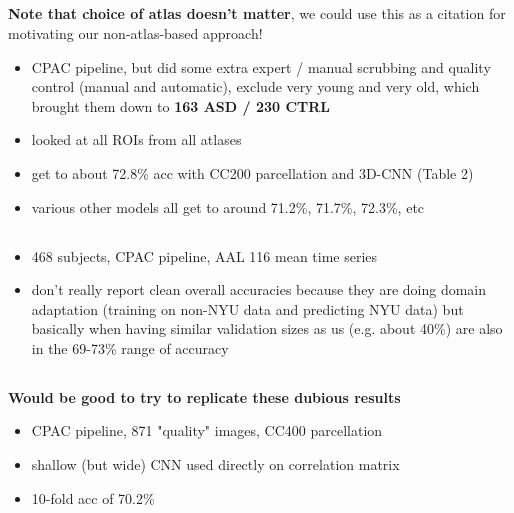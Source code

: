 \documentclass[10pt]{article}
\begin{document}
\subsection{\citet{khoslaEnsembleLearning3D2019}}

\textbf{Note that choice of atlas doesn't matter}, we could use this as a citation for motivating
our non-atlas-based approach!

\begin{itemize}
  \item CPAC pipeline, but did some extra expert / manual scrubbing and quality control (manual and
  automatic), exclude very young and very old, which brought them down to  \textbf{163 ASD / 230
  CTRL}
  \item looked at all ROIs from all atlases
  \item get to about 72.8\% acc with CC200 parcellation and 3D-CNN (Table 2)
  \item various other models all get to around 71.2\%, 71.7\%, 72.3\%, etc
\end{itemize}

\subsection{\citet{wangIdentifyingAutismSpectrum2020}}

\begin{itemize}
  \item 468 subjects, CPAC pipeline, AAL 116 mean time series
  \item don't really report clean overall accuracies because they are doing domain adaptation
  (training on non-NYU data and predicting NYU data) but basically when having similar validation
  sizes as us (e.g. about 40\%) are also in the 69-73\% range of accuracy
\end{itemize}

\subsection{\citet{sherkatghanadAutomatedDetectionAutism2020}}

\textbf{Would be good to try to replicate these dubious results}

\begin{itemize}
  \item CPAC pipeline, 871 "quality" images, CC400 parcellation
  \item shallow (but wide) CNN used directly on correlation matrix
  \item 10-fold acc of 70.2\%
\end{itemize}
\end{document}
